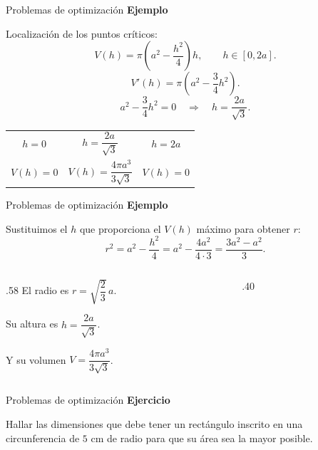 \documentclass[original_version/main.tex]{subfiles}
\begin{document}
\begin{frame}{Problemas de optimización}
\small\textbf{Ejemplo}\par Localización de los puntos críticos:
\[V(h)=\pi\left(a^2-\frac{h^2}{4}\right)h,\qquad h\in[0,2a].\]
\[V'(h)=\pi\left(a^2-\frac34h^2\right).\]
\[a^2-\frac34h^2=0\quad\Longrightarrow\quad h=\frac{2a}{\sqrt3}.\]
\begin{center}\renewcommand{\arraystretch}{1.8}
\begin{tabular}{c|c|c}
$h=0$ & $h=\dfrac{2a}{\sqrt3}$ & $h=2a$\\
$V(h)=0$ & $V(h)=\dfrac{4\pi a^3}{3\sqrt3}$ & $V(h)=0$
\end{tabular}\end{center}
\end{frame}
\begin{frame}{Problemas de optimización}
\small\textbf{Ejemplo}\par Sustituimos el $h$ que proporciona el $V(h)$ máximo para obtener $r$:
\[r^2=a^2-\frac{h^2}{4}=a^2-\frac{4a^2}{4\cdot3}=\frac{3a^2-a^2}{3}.\]
\begin{columns}[c]
\begin{column}{.58\textwidth}
El radio es $r=\sqrt{\dfrac23}\,a$.
\medskip

Su altura es $h=\dfrac{2a}{\sqrt3}$.
\medskip

Y su volumen $V=\dfrac{4\pi a^3}{3\sqrt3}$.
\end{column}
\begin{column}{.40\textwidth}\end{column}
\end{columns}
\end{frame}
\begin{frame}{Problemas de optimización}
\textbf{Ejercicio}\par Hallar las dimensiones que debe tener un rectángulo inscrito en una circunferencia de $5$ cm de radio para que su área sea la mayor posible.
\end{frame}
\end{document}
